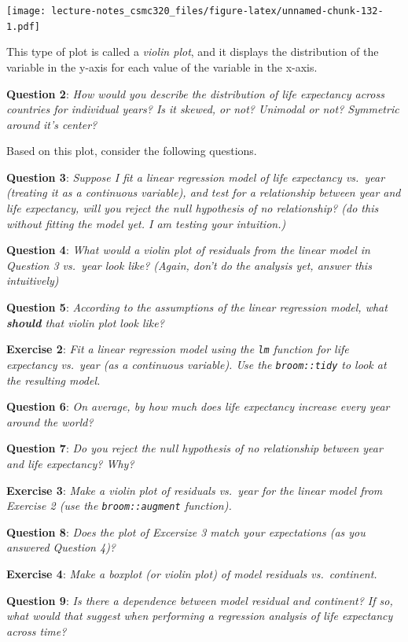 \documentclass[12pt,]{book}
\theoremstyle{definition}
\theoremstyle{definition}
\theoremstyle{definition}
\theoremstyle{remark}
\begin{document}
\texttt{[image: lecture-notes\_csmc320\_files/figure-latex/unnamed-chunk-132-1.pdf]}

This type of plot is called a \emph{violin plot}, and it displays the
distribution of the variable in the y-axis for each value of the
variable in the x-axis.

\textbf{Question 2}: \emph{How would you describe the distribution of
life expectancy across countries for individual years? Is it skewed, or
not? Unimodal or not? Symmetric around it's center?}

Based on this plot, consider the following questions.

\textbf{Question 3}: \emph{Suppose I fit a linear regression model of
life expectancy vs.~year (treating it as a continuous variable), and
test for a relationship between year and life expectancy, will you
reject the null hypothesis of no relationship? (do this without fitting
the model yet. I am testing your intuition.)}

\textbf{Question 4}: \emph{What would a violin plot of residuals from
the linear model in Question 3 vs.~year look like? (Again, don't do the
analysis yet, answer this intuitively)}

\textbf{Question 5}: \emph{According to the assumptions of the linear
regression model, what \textbf{should} that violin plot look like?}

\textbf{Exercise 2}: \emph{Fit a linear regression model using the
\texttt{lm} function for life expectancy vs.~year (as a continuous
variable). Use the \texttt{broom::tidy} to look at the resulting model.}

\textbf{Question 6}: \emph{On average, by how much does life expectancy
increase every year around the world?}

\textbf{Question 7}: \emph{Do you reject the null hypothesis of no
relationship between year and life expectancy? Why?}

\textbf{Exercise 3}: \emph{Make a violin plot of residuals vs.~year for
the linear model from Exercise 2 (use the \texttt{broom::augment}
function).}

\textbf{Question 8}: \emph{Does the plot of Excersize 3 match your
expectations (as you answered Question 4)?}

\textbf{Exercise 4}: \emph{Make a boxplot (or violin plot) of model
residuals vs.~continent.}

\textbf{Question 9}: \emph{Is there a dependence between model residual
and continent? If so, what would that suggest when performing a
regression analysis of life expectancy across time?}
\end{document}
